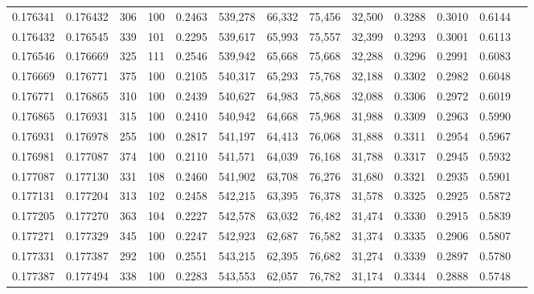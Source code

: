 \begin{tabular}{rrrrrrrrrrrrr}
0.176341 & 0.176432 &   306 & 100 &                                     0.2463 & 539,278 &  66,332 &  75,456 &  32,500 & 0.3288 & 0.3010 & 0.6144 \\
0.176432 & 0.176545 &   339 & 101 &                                     0.2295 & 539,617 &  65,993 &  75,557 &  32,399 & 0.3293 & 0.3001 & 0.6113 \\
0.176546 & 0.176669 &   325 & 111 &                                     0.2546 & 539,942 &  65,668 &  75,668 &  32,288 & 0.3296 & 0.2991 & 0.6083 \\
0.176669 & 0.176771 &   375 & 100 &                                     0.2105 & 540,317 &  65,293 &  75,768 &  32,188 & 0.3302 & 0.2982 & 0.6048 \\
0.176771 & 0.176865 &   310 & 100 &                                     0.2439 & 540,627 &  64,983 &  75,868 &  32,088 & 0.3306 & 0.2972 & 0.6019 \\
0.176865 & 0.176931 &   315 & 100 &                                     0.2410 & 540,942 &  64,668 &  75,968 &  31,988 & 0.3309 & 0.2963 & 0.5990 \\
0.176931 & 0.176978 &   255 & 100 &                                     0.2817 & 541,197 &  64,413 &  76,068 &  31,888 & 0.3311 & 0.2954 & 0.5967 \\
0.176981 & 0.177087 &   374 & 100 &                                     0.2110 & 541,571 &  64,039 &  76,168 &  31,788 & 0.3317 & 0.2945 & 0.5932 \\
0.177087 & 0.177130 &   331 & 108 &                                     0.2460 & 541,902 &  63,708 &  76,276 &  31,680 & 0.3321 & 0.2935 & 0.5901 \\
0.177131 & 0.177204 &   313 & 102 &                                     0.2458 & 542,215 &  63,395 &  76,378 &  31,578 & 0.3325 & 0.2925 & 0.5872 \\
0.177205 & 0.177270 &   363 & 104 &                                     0.2227 & 542,578 &  63,032 &  76,482 &  31,474 & 0.3330 & 0.2915 & 0.5839 \\
0.177271 & 0.177329 &   345 & 100 &                                     0.2247 & 542,923 &  62,687 &  76,582 &  31,374 & 0.3335 & 0.2906 & 0.5807 \\
0.177331 & 0.177387 &   292 & 100 &                                     0.2551 & 543,215 &  62,395 &  76,682 &  31,274 & 0.3339 & 0.2897 & 0.5780 \\
0.177387 & 0.177494 &   338 & 100 &                                     0.2283 & 543,553 &  62,057 &  76,782 &  31,174 & 0.3344 & 0.2888 & 0.5748 \\

\end{tabular}
